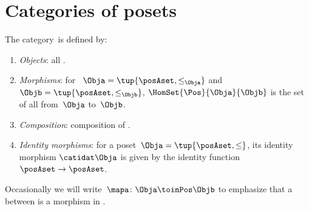 
\section[Categories of posets]{Categories of posets}
\label{sec:category-Pos}

\begin{ctdefinition}
    \label{def:Pos}
    The category~\Pos is defined by:
    \begin{enumerate}
        \item \emph{Objects}: all .
        \item \emph{Morphisms}: for ~$\Obja = \tup{\posAset, \leq_\Obja}$ and $\Objb = \tup{\posAset, \leq_\Objb}$,  $\HomSet{\Pos}{\Obja}{\Objb}$ is the set of all  from~$\Obja$ to~$\Objb$.
        \item \emph{Composition}: composition of .
        \item \emph{Identity morphisms}: for a poset~$\Obja = \tup{\posAset, \leq}$, its identity morphism $\catidat\Obja$ is given by the identity function $\posAset \to \posAset$.
    \end{enumerate}
\end{ctdefinition}

Occasionally we will write~$\mapa \colon \Obja \toinPos \Objb$ to emphasize that a  between  is a morphism in \Pos.
